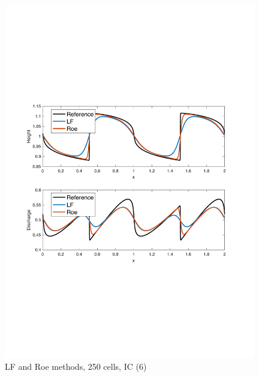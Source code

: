 \documentclass[11pt,a4paper]{article}
\begin{document}
\begin{figure}[!htb]
    \centering
    \includegraphics[width=11cm]{pictures/IC_3_250_cells.pdf}
    \caption{LF and Roe methods, 250 cells, IC (6)}
    \label{fig:IC_3_250_cells}
\end{figure}
\end{document}
